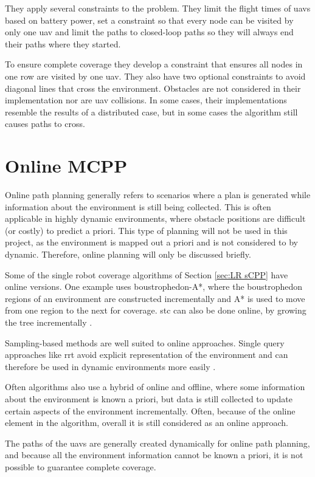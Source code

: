 They apply several constraints to the problem. They limit the flight times of \acp{uav} based on battery power, set a constraint so that every node can be visited by only one \ac{uav} and limit the paths to closed-loop paths so they will always end their paths where they started. 

To ensure complete coverage they develop a constraint that ensures all nodes in one row are visited by one \ac{uav}. They also have two optional constraints to avoid diagonal lines that cross the environment. Obstacles are not considered in their implementation nor are \ac{uav} collisions. In some cases, their implementations resemble the results of a distributed case, but in some cases the algorithm still causes paths to cross.
\section{Online MCPP}
\label{sec:LR Online MCPP}
Online path planning generally refers to scenarios where a plan is generated while information about the environment is still being collected. This is often applicable in highly dynamic environments, where obstacle positions are difficult (or costly) to predict a priori. This type of planning will not be used in this project, as the environment is mapped out a priori and is not considered to by dynamic. Therefore, online planning will only be discussed briefly.

Some of the single robot coverage algorithms of Section \ref{sec:LR sCPP} have online versions. One example uses boustrophedon-A*, where the boustrophedon regions of an environment are constructed incrementally and A* is used to move from one region to the next for coverage\cite{Viet2012}. \ac{stc} can also be done online, by growing the tree incrementally \cite{Gabriely2001}. 

Sampling-based methods are well suited to online approaches. Single query approaches like \ac{rrt} avoid explicit representation of the environment and can therefore be used in dynamic environments more easily \cite{Lavalle2006}.

Often algorithms also use a hybrid of online and offline, where some information about the environment is known a priori, but data is still collected to update certain aspects of the environment incrementally. Often, because of the online element in the algorithm, overall it is still considered as an online approach. 

The paths of the \acp{uav} are generally created dynamically for online path planning, and because all the environment information cannot be known a priori, it is not possible to guarantee complete coverage.

